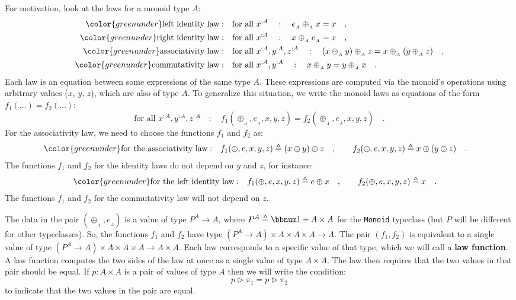For motivation, look at the laws for a monoid type $A$:
\begin{align*}
{\color{greenunder}\text{left identity law}:}\quad & \text{for all }x^{:A}\quad:\quad e_{_{A}}\oplus_{_{A}}x=x\quad,\\
{\color{greenunder}\text{right identity law}:}\quad & \text{for all }x^{:A}\quad:\quad x\oplus_{_{A}}e_{_{A}}=x\quad,\\
{\color{greenunder}\text{associativity law}:}\quad & \text{for all }x^{:A},y^{:A},z^{:A}\quad:\quad(x\oplus_{_{A}}y)\oplus_{_{A}}z=x\oplus_{_{A}}(y\oplus_{_{A}}z)\quad,\\
{\color{greenunder}\text{commutativity law}:}\quad & \text{for all }x^{:A},y^{:A}\quad:\quad x\oplus_{_{A}}y=y\oplus_{_{A}}x\quad.
\end{align*}
Each law is an equation between some expressions of the same type
$A$. These expressions are computed via the monoid\textsf{'}s operations using
arbitrary values ($x$, $y$, $z$), which are also of type $A$.
To generalize this situation, we write the monoid laws as equations
of the form $f_{1}(...)=f_{2}(...)$:
\[
\text{for all }x^{:A},y^{:A},z^{:A}\quad:\quad f_{1}(\oplus_{_{A}},e_{_{A}},x,y,z)=f_{2}(\oplus_{_{A}},e_{_{A}},x,y,z)\quad.
\]
For the associativity law, we need to choose the functions $f_{1}$
and $f_{2}$ as:
\begin{align*}
{\color{greenunder}\text{for the associativity law}:}\quad & f_{1}(\oplus,e,x,y,z)\triangleq(x\oplus y)\oplus z\quad,\quad\quad f_{2}(\oplus,e,x,y,z)\triangleq x\oplus(y\oplus z)\quad.
\end{align*}
The functions $f_{1}$ and $f_{2}$ for the identity laws do not depend
on $y$ and $z$, for instance:
\begin{align*}
{\color{greenunder}\text{for the left identity law}:}\quad & f_{1}(\oplus,e,x,y,z)\triangleq e\oplus x\quad,\quad\quad f_{2}(\oplus,e,x,y,z)\triangleq x\quad.
\end{align*}
The functions $f_{1}$ and $f_{2}$ for the commutativity law will
not depend on $z$.

The data in the pair $(\oplus_{_{A}},e_{_{A}})$ is a value of type
$P^{A}\rightarrow A$, where $P^{A}\triangleq\bbnum 1+A\times A$
for the \lstinline!Monoid!
typeclass (but $P$ will be different for other typeclasses). So,
the functions $f_{1}$ and $f_{2}$ have type $(P^{A}\rightarrow A)\times A\times A\times A\rightarrow A$.
The pair $(f_{1},f_{2})$ is equivalent to a single value of type
$(P^{A}\rightarrow A)\times A\times A\times A\rightarrow A\times A$.
Each law corresponds to a specific value of that type, which we will
call a \textbf{law function}. A law function
computes the two sides of the law at once as a single value of type
$A\times A$. The law then requires that the two values in that pair
should be equal. If $p:A\times A$ is a pair of values of type $A$
then we will write the condition: 
\[
p\triangleright\pi_{1}=p\triangleright\pi_{2}
\]
to indicate that the two values in the pair are equal.

